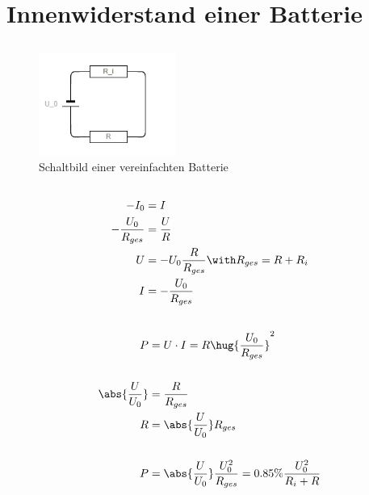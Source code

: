 \documentclass[11pt, german]{article}
\begin{document}
\section{Innenwiderstand einer Batterie}
\subsection{}
\begin{figure}[h]
    \centering
    \includegraphics[width=0.4\textwidth]{battery}
    \caption{Schaltbild einer vereinfachten Batterie}
\end{figure}

\subsection{}
\begin{align*}
    -I_0 &= I\\
    -\frac{U_0}{R_{ges}} &= \frac{U}{R}\\
    U &= -U_0 \frac{R}{R_{ges}} \with R_{ges} = R + R_i\\
    I &=  -\frac{U_0}{R_{ges}}\\
\end{align*}

\subsection{}
\begin{align*}
    P &= U \cdot I = R \hug{\frac{U_0}{R_{ges}}}^2 \\
    \\
    \abs{\frac U {U_0}} &= \frac{R}{R_{ges}}\\
    R &= \abs{\frac U {U_0}} R_{ges}\\
    \\
    P &= \abs{\frac U {U_0}} \frac{U_0^2}{R_{ges}} = 0.85\% \frac{U_0^2}{R_i + R} 
\end{align*}
\end{document}
